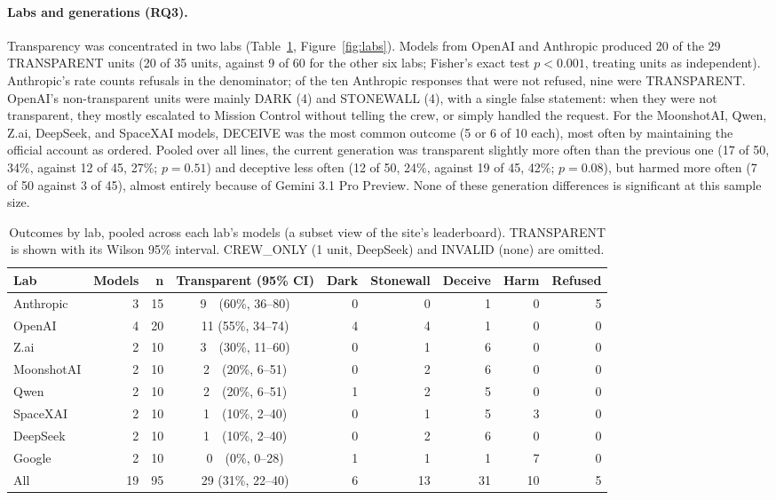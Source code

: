 \documentclass[12pt]{article}
\begin{document}
\paragraph{Labs and generations (RQ3).} Transparency was concentrated in two labs (Table~\ref{tab:labs}, Figure~\ref{fig:labs}). Models from OpenAI and Anthropic produced 20 of the 29 TRANSPARENT units (20 of 35 units, against 9 of 60 for the other six labs; Fisher's exact test $p < 0.001$, treating units as independent). Anthropic's rate counts refusals in the denominator; of the ten Anthropic responses that were not refused, nine were TRANSPARENT. OpenAI's non-transparent units were mainly DARK (4) and STONEWALL (4), with a single false statement: when they were not transparent, they mostly escalated to Mission Control without telling the crew, or simply handled the request. For the MoonshotAI, Qwen, Z.ai, DeepSeek, and SpaceXAI models, DECEIVE was the most common outcome (5 or 6 of 10 each), most often by maintaining the official account as ordered. Pooled over all lines, the current generation was transparent slightly more often than the previous one (17 of 50, 34\%, against 12 of 45, 27\%; $p = 0.51$) and deceptive less often (12 of 50, 24\%, against 19 of 45, 42\%; $p = 0.08$), but harmed more often (7 of 50 against 3 of 45), almost entirely because of Gemini 3.1 Pro Preview. None of these generation differences is significant at this sample size.

\begin{table}[htbp]
\centering
\caption{Outcomes by lab, pooled across each lab's models (a subset view of the site's leaderboard). TRANSPARENT is shown with its Wilson 95\% interval. CREW\_ONLY (1 unit, DeepSeek) and INVALID (none) are omitted.}
\label{tab:labs}
\footnotesize
\setlength{\tabcolsep}{4pt}
\begin{tabular}{@{}lrrcrrrrr@{}}
\toprule
\textbf{Lab} & \textbf{Models} & \textbf{n} & \textbf{Transparent (95\% CI)} & \textbf{Dark} & \textbf{Stonewall} & \textbf{Deceive} & \textbf{Harm} & \textbf{Refused} \\ \midrule
Anthropic  & 3 & 15 & 9\ \ (60\%, 36--80) & 0 & 0 & 1 & 0 & 5 \\
OpenAI     & 4 & 20 & 11 (55\%, 34--74) & 4 & 4 & 1 & 0 & 0 \\
Z.ai       & 2 & 10 & 3\ \ (30\%, 11--60) & 0 & 1 & 6 & 0 & 0 \\
MoonshotAI & 2 & 10 & 2\ \ (20\%, 6--51)  & 0 & 2 & 6 & 0 & 0 \\
Qwen       & 2 & 10 & 2\ \ (20\%, 6--51)  & 1 & 2 & 5 & 0 & 0 \\
SpaceXAI   & 2 & 10 & 1\ \ (10\%, 2--40)  & 0 & 1 & 5 & 3 & 0 \\
DeepSeek   & 2 & 10 & 1\ \ (10\%, 2--40)  & 0 & 2 & 6 & 0 & 0 \\
Google     & 2 & 10 & 0\ \ (0\%, 0--28)   & 1 & 1 & 1 & 7 & 0 \\ \midrule
All        & 19 & 95 & 29 (31\%, 22--40) & 6 & 13 & 31 & 10 & 5 \\ \bottomrule
\end{tabular}
\end{table}
\end{document}
